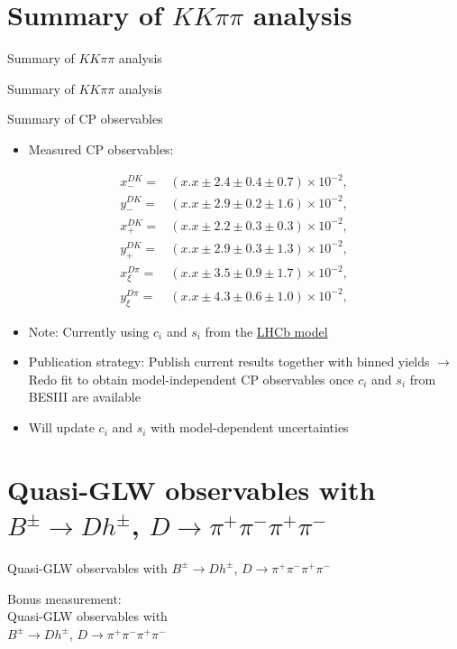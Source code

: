 \documentclass{beamer}
\begin{document}
\section{Summary of $KK\pi\pi$ analysis}
\begin{frame}{Summary of $KK\pi\pi$ analysis}
  \begin{center}
    {\huge Summary of $KK\pi\pi$ analysis}
  \end{center}
\end{frame}

\begin{frame}{Summary of CP observables}
  \begin{itemize}
    \item{Measured CP observables:}
  \end{itemize}
  \begin{align*}
    x_-^{DK} =& (x.x \pm 2.4 \pm 0.4 \pm 0.7)\times 10^{-2}, \\
    y_-^{DK} =& (x.x \pm 2.9 \pm 0.2 \pm 1.6)\times 10^{-2}, \\
    x_+^{DK} =& (x.x \pm 2.2 \pm 0.3 \pm 0.3)\times 10^{-2}, \\
    y_+^{DK} =& (x.x \pm 2.9 \pm 0.3 \pm 1.3)\times 10^{-2}, \\
    x_\xi^{D\pi} =& (x.x \pm 3.5 \pm 0.9 \pm 1.7)\times 10^{-2}, \\
    y_\xi^{D\pi} =& (x.x \pm 4.3 \pm 0.6 \pm 1.0)\times 10^{-2},
  \end{align*}
  \vspace{-0.5cm}
  \begin{itemize}
    \item{Note: Currently using $c_i$ and $s_i$ from the \underline{LHCb model}}
    \item{Publication strategy: Publish current results together with binned yields $\to$ Redo fit to obtain model-independent CP observables once $c_i$ and $s_i$ from BESIII are available}
    \item{Will update $c_i$ and $s_i$ with model-dependent uncertainties}
  \end{itemize}
\end{frame}

\section{Quasi-GLW observables with $B^\pm\to Dh^\pm$, $D\to\pi^+\pi^-\pi^+\pi^-$}
\begin{frame}{Quasi-GLW observables with $B^\pm\to Dh^\pm$, $D\to\pi^+\pi^-\pi^+\pi^-$}
  \begin{center}
    {\huge Bonus measurement: \\ \vspace{0.5cm} Quasi-GLW observables with \\ $B^\pm\to Dh^\pm$, $D\to\pi^+\pi^-\pi^+\pi^-$}
  \end{center}
\end{frame}
\end{document}

